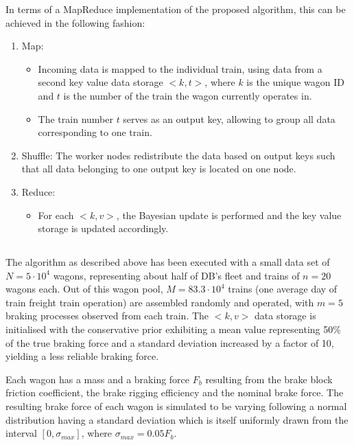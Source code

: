 \documentclass[a4paper, 12pt]{scrartcl}
\begin{document}
In terms of a MapReduce implementation of the proposed algorithm, this can be achieved in the following fashion:
\begin{enumerate}
	\item Map: 
	\begin{itemize}
		\item Incoming data is mapped to the individual train, using data from a second key value data storage $<k, t>$, where $k$ is the unique wagon ID and $t$ is the number of the train the wagon currently operates in.
		\item The train number $t$ serves as an output key, allowing to group all data corresponding to one train.
		\end{itemize}
	\item Shuffle: The worker nodes redistribute the data based on output keys such that all data belonging to one output key is located on one node.
	\item Reduce: 
	\begin{itemize}
		\item For each $<k, v>$, the Bayesian update is performed and the key value storage is updated accordingly.
		\end{itemize}
\end{enumerate}

\subsection{}
The algorithm as described above has been executed with a small data set of $N = 5 \cdot 10^4$ wagons, representing about half of DB's fleet and trains of $n = 20$ wagons each. Out of this wagon pool, $M = 83.3 \cdot 10^4$ trains (one average day of train freight train operation) are assembled randomly and operated, with $m = 5$ braking processes observed from each train. The $<k,v>$ data storage is initialised with the conservative prior exhibiting a mean value representing 50\% of the true braking force and a standard deviation increased by a factor of 10, yielding a less reliable braking force.

Each wagon has a mass and a braking force $F_{b}$ resulting from the brake block friction coefficient, the brake rigging efficiency and the nominal brake force. The resulting brake force of each wagon is simulated to be varying following a normal distribution having a standard deviation which is itself uniformly drawn from the interval $\left[0, \sigma_{max}\right]$, where $\sigma_{max} = 0.05 F_{b}$.
\end{document}

